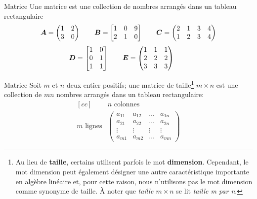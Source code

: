 \documentclass[french, handout]{beamer}
\begin{document}
	\begin{frame}{Matrice}
	Une matrice est une collection de nombres arrangés dans un tableau rectangulaire
		\[
\boldsymbol{A} = \begin{pmatrix}
1 & 2 \\
3 & 0 
\end{pmatrix} \qquad 
\boldsymbol{B} = \begin{bmatrix}
1 & 0 & 9 \\
2 & 1 & 0 
\end{bmatrix} \qquad
\boldsymbol{C} = \begin{pmatrix}
2 & 1 & 3 & 4\\
1 & 2 & 3 & 4
\end{pmatrix} \]
\[
\boldsymbol{D} = \begin{bmatrix}
1 & 0  \\
0 & 1  \\
1 & 1
\end{bmatrix} \qquad
\boldsymbol{E} = \begin{pmatrix}
1 & 1 & 1 \\
2 & 2 & 2 \\
3 & 3 & 3
\end{pmatrix} \qquad
	\]
\end{frame}		
	
	\begin{frame}{Matrice}
	Soit $m$ et $n$ deux entier positifs; une matrice de taille\footnote{Au lieu de \textbf{taille}, 
		certains utilisent parfois le mot \textbf{dimension}.  
		Cependant, le mot dimension peut également désigner une autre caractéristique importante en algèbre linéaire et,
		pour cette raison, nous n'utilisons pas le mot dimension comme synonyme de taille. 
		À noter que \textit{taille $m\times n$} se lit \textit{taille m par n}.} $m\times n$
	est une collection de $mn$ nombres arrangés dans un tableau rectangulaire:
\[
\begin{matrix}[cc]
&\text{$n$ colonnes} \\
\text{$m$ lignes}& \begin{pmatrix}
a_{11} & a_{12} & \ldots & a_{1n}\\
a_{21} & a_{22} & \ldots & a_{2n}\\
\vdots & \vdots & \vdots & \vdots \\
a_{m1} & a_{m2} & \ldots & a_{mn}
\end{pmatrix}
\end{matrix}
\]
	\end{frame}
	
\end{document}
